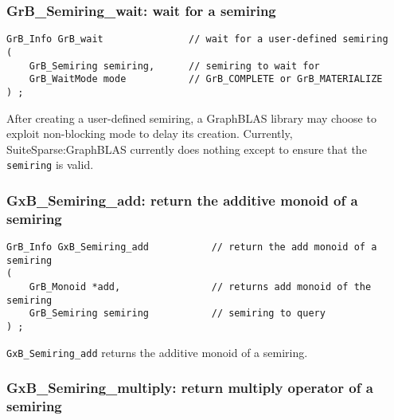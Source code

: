 \documentclass[12pt]{article}
\begin{document}
\subsubsection{{\sf GrB\_Semiring\_wait:} wait for a semiring}
\label{semiring_wait}

\begin{mdframed}[userdefinedwidth=6in]
{\footnotesize
\begin{verbatim}
GrB_Info GrB_wait               // wait for a user-defined semiring
(
    GrB_Semiring semiring,      // semiring to wait for
    GrB_WaitMode mode           // GrB_COMPLETE or GrB_MATERIALIZE
) ;
\end{verbatim}
}\end{mdframed}

After creating a user-defined semiring, a GraphBLAS library may choose to
exploit non-blocking mode to delay its creation.  Currently,
SuiteSparse:GraphBLAS currently does nothing except to ensure that the
\verb'semiring' is valid.

\subsubsection{{\sf GxB\_Semiring\_add:} return the additive monoid of a semiring}
\label{semiring_add}

\begin{mdframed}[userdefinedwidth=6in]
{\footnotesize
\begin{verbatim}
GrB_Info GxB_Semiring_add           // return the add monoid of a semiring
(
    GrB_Monoid *add,                // returns add monoid of the semiring
    GrB_Semiring semiring           // semiring to query
) ;
\end{verbatim}
} \end{mdframed}

\verb'GxB_Semiring_add' returns the additive monoid of a semiring.

\subsubsection{{\sf GxB\_Semiring\_multiply:} return multiply operator of a semiring}
\label{semiring_multiply}
\end{document}
